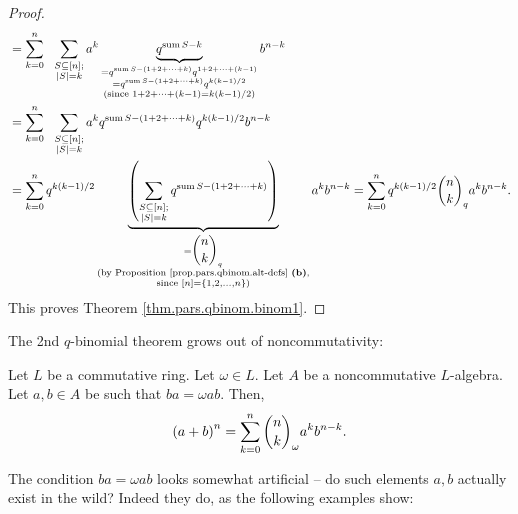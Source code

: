 \begin{proof}
\begin{align*}
&  =\sum_{k=0}^{n}\ \ \sum_{\substack{S\subseteq\left[  n\right]
;\\\left\vert S\right\vert =k}}a^{k}\underbrace{q^{\operatorname*{sum}S-k}%
}_{\substack{=q^{\operatorname*{sum}S-\left(  1+2+\cdots+k\right)
}q^{1+2+\cdots+\left(  k-1\right)  }\\=q^{\operatorname*{sum}S-\left(
1+2+\cdots+k\right)  }q^{k\left(  k-1\right)  /2}\\\text{(since }%
1+2+\cdots+\left(  k-1\right)  =k\left(  k-1\right)  /2\text{)}}}b^{n-k}\\
&  =\sum_{k=0}^{n}\ \ \sum_{\substack{S\subseteq\left[  n\right]
;\\\left\vert S\right\vert =k}}a^{k}q^{\operatorname*{sum}S-\left(
1+2+\cdots+k\right)  }q^{k\left(  k-1\right)  /2}b^{n-k}\\
&  =\sum_{k=0}^{n}q^{k\left(  k-1\right)  /2}\underbrace{\left(
\sum\limits_{\substack{S\subseteq\left[  n\right]  ;\\\left\vert S\right\vert
=k}}q^{\operatorname*{sum}S-\left(  1+2+\cdots+k\right)  }\right)
}_{\substack{=\dbinom{n}{k}_{q}\\\text{(by Proposition
\ref{prop.pars.qbinom.alt-defs} \textbf{(b)},}\\\text{since }\left[  n\right]
=\left\{  1,2,\ldots,n\right\}  \text{)}}}a^{k}b^{n-k}=\sum_{k=0}%
^{n}q^{k\left(  k-1\right)  /2}\dbinom{n}{k}_{q}a^{k}b^{n-k}.
\end{align*}
This proves Theorem \ref{thm.pars.qbinom.binom1}.
\end{proof}

The 2nd $q$-binomial theorem grows out of noncommutativity:

\begin{theorem}
%
\label{thm.pars.qbinom.binom2}Let $L$ be a commutative ring. Let $\omega\in
L$. Let $A$ be a noncommutative $L$-algebra. Let $a,b\in A$ be such that
$ba=\omega ab$. Then,%
\[
\left(  a+b\right)  ^{n}=\sum_{k=0}^{n}\dbinom{n}{k}_{\omega}a^{k}b^{n-k}.
\]

\end{theorem}

The condition $ba=\omega ab$ looks somewhat artificial -- do such elements
$a,b$ actually exist in the wild? Indeed they do, as the following examples show:

